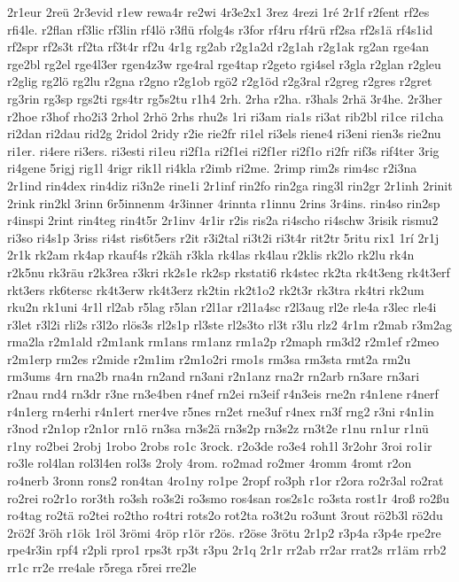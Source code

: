 {2r1eur
2reü
2r3evid
r1ew
rewa4r
re2wi
4r3e2x1
3rez
4rezi
1ré
2r1f
r2fent
rf2es
rfi4le.
r2flan
rf3lic
rf3lin
rf4lö
r3flü
rfolg4s
r3for
rf4ru
rf4rü
rf2sa
rf2s1ä
rf4s1id
rf2spr
rf2s3t
rf2ta
rf3t4r
rf2u
4r1g
rg2ab
r2g1a2d
r2g1ah
r2g1ak
rg2an
rge4an
rge2bl
rg2el
rge4l3er
rgen4z3w
rge4ral
rge4tap
r2geto
rgi4sel
r3gla
r2glan
r2gleu
r2glig
rg2lö
rg2lu
r2gna
r2gno
r2g1ob
rgö2
r2g1öd
r2g3ral
r2greg
r2gres
r2gret
rg3rin
rg3sp
rgs2ti
rgs4tr
rg5s2tu
r1h4
2rh.
2rha
r2ha.
r3hals
2rhä
3r4he.
2r3her
r2hoe
r3hof
rho2i3
2rhol
2rhö
2rhs
rhu2s
1ri
ri3am
ria1s
ri3at
rib2bl
ri1ce
ri1cha
ri2dan
ri2dau
rid2g
2ridol
2ridy
r2ie
rie2fr
ri1el
ri3els
riene4
ri3eni
rien3s
rie2nu
ri1er.
ri4ere
ri3ers.
ri3esti
ri1eu
ri2f1a
ri2f1ei
ri2f1er
ri2f1o
ri2fr
rif3s
rif4ter
3rig
ri4gene
5rigj
rig1l
4rigr
rik1l
ri4kla
r2imb
ri2me.
2rimp
rim2s
rim4sc
r2i3na
2r1ind
rin4dex
rin4diz
ri3n2e
rine1i
2r1inf
rin2fo
rin2ga
ring3l
rin2gr
2r1inh
2rinit
2rink
rin2kl
3rinn
6r5innenm
4r3inner
4rinnta
r1innu
2rins
3r4ins.
rin4so
rin2sp
r4inspi
2rint
rin4teg
rin4t5r
2r1inv
4r1ir
r2is
ris2a
ri4scho
ri4schw
3risik
rismu2
ri3so
ri4s1p
3riss
ri4st
ris6t5ers
r2it
r3i2tal
ri3t2i
ri3t4r
rit2tr
5ritu
rix1
1rí
2r1j
2r1k
rk2am
rk4ap
rkauf4s
r2käh
r3kla
rk4las
rk4lau
r2klis
rk2lo
rk2lu
rk4n
r2k5nu
rk3räu
r2k3rea
r3kri
rk2s1e
rk2sp
rkstati6
rk4stec
rk2ta
rk4t3eng
rk4t3erf
rkt3ers
rk6tersc
rk4t3erw
rk4t3erz
rk2tin
rk2t1o2
rk2t3r
rk3tra
rk4tri
rk2um
rku2n
rk1uni
4r1l
rl2ab
r5lag
r5lan
r2l1ar
r2l1a4sc
r2l3aug
rl2e
rle4a
r3lec
rle4i
r3let
r3l2i
rli2s
r3l2o
rlös3s
rl2s1p
rl3ste
rl2s3to
rl3t
r3lu
rlz2
4r1m
r2mab
r3m2ag
rma2la
r2m1ald
r2m1ank
rm1ans
rm1anz
rm1a2p
r2maph
rm3d2
r2m1ef
r2meo
r2m1erp
rm2es
r2mide
r2m1im
r2m1o2ri
rmo1s
rm3sa
rm3sta
rmt2a
rm2u
rm3ums
4rn
rna2b
rna4n
rn2and
rn3ani
r2n1anz
rna2r
rn2arb
rn3are
rn3ari
r2nau
rnd4
rn3dr
r3ne
rn3e4ben
r4nef
rn2ei
rn3eif
r4n3eis
rne2n
r4n1ene
r4nerf
r4n1erg
rn4erhi
r4n1ert
rner4ve
r5nes
rn2et
rne3uf
r4nex
rn3f
rng2
r3ni
r4n1in
r3nod
r2n1op
r2n1or
rn1ö
rn3sa
rn3s2ä
rn3s2p
rn3s2z
rn3t2e
r1nu
rn1ur
r1nü
r1ny
ro2bei
2robj
1robo
2robs
ro1c
3rock.
r2o3de
ro3e4
roh1l
3r2ohr
3roi
ro1ir
ro3le
rol4lan
rol3l4en
rol3s
2roly
4rom.
ro2mad
ro2mer
4romm
4romt
r2on
ro4nerb
3ronn
rons2
ron4tan
4ro1ny
ro1pe
2ropf
ro3ph
r1or
r2ora
ro2r3al
ro2rat
ro2rei
ro2r1o
ror3th
ro3sh
ro3s2i
ro3smo
ros4san
ros2s1c
ro3sta
rost1r
4roß
ro2ßu
ro4tag
ro2tä
ro2tei
ro2tho
ro4tri
rots2o
rot2ta
ro3t2u
ro3unt
3rout
rö2b3l
rö2du
2rö2f
3röh
r1ök
1röl
3römi
4röp
r1ör
r2ös.
r2öse
3rötu
2r1p2
r3p4a
r3p4e
rpe2re
rpe4r3in
rpf4
r2pli
rpro1
rps3t
rp3t
r3pu
2r1q
2r1r
rr2ab
rr2ar
rrat2s
rr1äm
rrb2
rr1c
rr2e
rre4ale
r5rega
r5rei
rre2le
}
